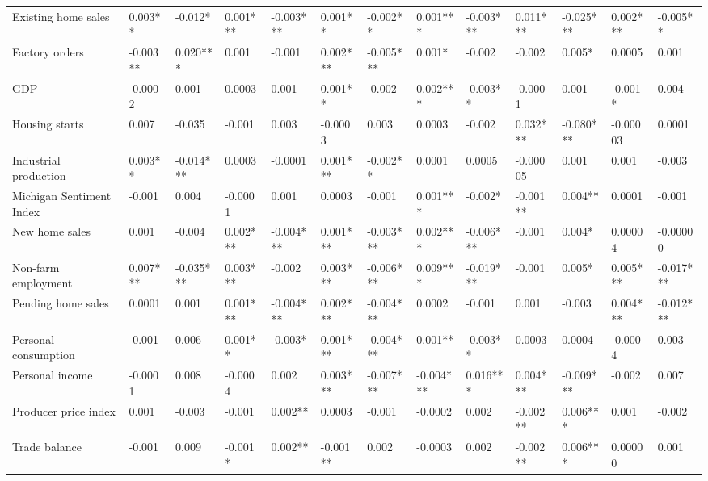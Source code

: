 \begin{landscape}
\begin{table}[]
{\begin{tabular}{lllllllllllll}
Existing home sales      & 0.003**  & -0.012*   & 0.001***  & -0.003*** & 0.001**  & -0.002**  & 0.001***  & -0.003*** & 0.011***  & -0.025*** & 0.002*** & -0.005**  \\
Factory orders           & -0.003** & 0.020***  & 0.001     & -0.001    & 0.002*** & -0.005*** & 0.001*    & -0.002    & -0.002    & 0.005*    & 0.0005   & 0.001     \\
GDP                      & -0.0002  & 0.001     & 0.0003    & 0.001     & 0.001**  & -0.002    & 0.002***  & -0.003**  & -0.0001   & 0.001     & -0.001*  & 0.004     \\
Housing starts           & 0.007    & -0.035    & -0.001    & 0.003     & -0.0003  & 0.003     & 0.0003    & -0.002    & 0.032***  & -0.080*** & -0.00003 & 0.0001    \\
Industrial production    & 0.003**  & -0.014*** & 0.0003    & -0.0001   & 0.001*** & -0.002**  & 0.0001    & 0.0005    & -0.00005  & 0.001     & 0.001    & -0.003    \\
Michigan Sentiment Index & -0.001   & 0.004     & -0.0001   & 0.001     & 0.0003   & -0.001    & 0.001***  & -0.002*   & -0.001**  & 0.004**   & 0.0001   & -0.001    \\
New home sales           & 0.001    & -0.004    & 0.002***  & -0.004*** & 0.001*** & -0.003*** & 0.002***  & -0.006*** & -0.001    & 0.004*    & 0.00004  & -0.00000  \\
Non-farm employment      & 0.007*** & -0.035*** & 0.003***  & -0.002    & 0.003*** & -0.006*** & 0.009***  & -0.019*** & -0.001    & 0.005*    & 0.005*** & -0.017*** \\
Pending home sales       & 0.0001   & 0.001     & 0.001***  & -0.004*** & 0.002*** & -0.004*** & 0.0002    & -0.001    & 0.001     & -0.003    & 0.004*** & -0.012*** \\
Personal consumption     & -0.001   & 0.006     & 0.001**   & -0.003*   & 0.001*** & -0.004*** & 0.001**   & -0.003**  & 0.0003    & 0.0004    & -0.0004  & 0.003     \\
Personal income          & -0.0001  & 0.008     & -0.0004   & 0.002     & 0.003*** & -0.007*** & -0.004*** & 0.016***  & 0.004***  & -0.009*** & -0.002   & 0.007     \\
Producer price index     & 0.001    & -0.003    & -0.001    & 0.002**   & 0.0003   & -0.001    & -0.0002   & 0.002     & -0.002**  & 0.006***  & 0.001    & -0.002    \\
Trade balance            & -0.001   & 0.009     & -0.001*   & 0.002**   & -0.001** & 0.002     & -0.0003   & 0.002     & -0.002**  & 0.006***  & 0.00000  & 0.001     \\ \hline

\end{tabular}}
\end{table}
\end{landscape}
